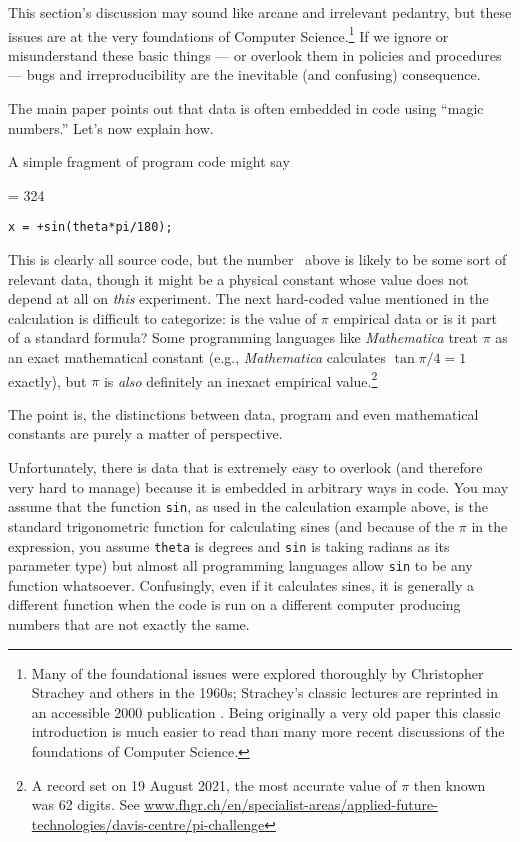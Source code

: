 \documentclass[10pt,a4paper]{article}
\begin{document}
This section's discussion may sound like arcane and irrelevant pedantry, but these issues are at the very foundations of Computer Science.\footnote{{Many of the foundational issues were explored thoroughly by Christopher Strachey and others in the 1960s; Strachey's classic lectures are reprinted in an accessible 2000 publication \cite{strachey}. Being originally a very old paper this classic introduction is much easier to read than many more recent discussions of the foundations of Computer Science.}} If we ignore or misunderstand these basic things --- or overlook them in policies and procedures --- bugs and irreproducibility are the inevitable (and confusing) consequence.

The main paper points out that data is often embedded in code using ``magic numbers.'' Let's now explain how. 

A simple fragment of program code might say

\newcount \magicNumber \magicNumber = 324
\begin{center}\texttt{x = \the\magicNumber+sin(theta*pi/180);}\end{center}

This is clearly all source code, but the number \the\magicNumber\ above is likely to be some sort of relevant data, though it might be a physical constant whose value does not depend at all on \emph{this\/} experiment. The next hard-coded value mentioned in the calculation is difficult to categorize: is the value of $\pi$ empirical data or is it part of a standard formula? Some programming languages like \emph{Mathematica\/} treat $\pi$ as an exact mathematical constant (e.g., \emph{Mathematica\/} calculates $\tan\pi/4 = 1$ exactly), but $\pi$ is \emph{also\/} definitely an inexact empirical value.\footnote{A record set on 19 August 2021, the most accurate value of $\pi$ then known was 
62 digits. %
See \url{www.fhgr.ch/en/specialist-areas/applied-future-technologies/davis-centre/pi-challenge}} 

The point is, the distinctions between data, program and even mathematical constants are purely a matter of perspective.

Unfortunately, there is data that is extremely easy to overlook (and therefore very hard to manage) because it is embedded in arbitrary ways in code. You may assume that the function \texttt{sin}, as used in the calculation example above, is the standard trigonometric function for calculating sines (and because of the $\pi$ in the expression, you assume \texttt{theta} is degrees and \texttt{sin} is taking radians as its parameter type) but almost all programming languages allow \texttt{sin} to be any function whatsoever. Confusingly, even if it calculates sines, it is generally a different function when the code is run on a different computer producing numbers that are not exactly the same.
\end{document}
